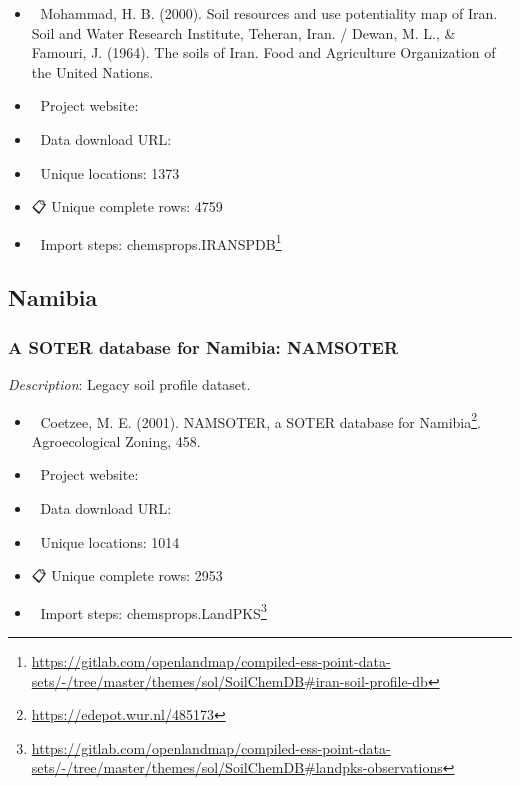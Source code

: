 \documentclass[
  graybox,natbib,nospthms]{svmono}
\providecommand{\tightlist}{%
  \setlength{\itemsep}{0pt}\setlength{\parskip}{0pt}}
\providecommand{\tightlist}{\setlength{\itemsep}{0pt}\setlength{\parskip}{0pt}}
\renewcommand{\href}[2]{#2 (\url{#1})}
\renewcommand{\href}[2]{#2\footnote{\url{#1}}}
\begin{document}
\begin{itemize}
\tightlist
\item
  📕 Mohammad, H. B. (2000). Soil resources and use potentiality map of Iran. Soil and Water Research Institute, Teheran, Iran. / Dewan, M. L., \& Famouri, J. (1964). The soils of Iran. Food and Agriculture Organization of the United Nations.\\
\item
  🔗 Project website:\\
\item
  📂 Data download URL:\\
\item
  📍 Unique locations: 1373\\
\item
  📋 Unique complete rows: 4759\\
\item
  📝 Import steps: \href{https://gitlab.com/openlandmap/compiled-ess-point-data-sets/-/tree/master/themes/sol/SoilChemDB\#iran-soil-profile-db}{chemsprops.IRANSPDB}
\end{itemize}

\hypertarget{namibia}{%
\subsection{Namibia}\label{namibia}}

\hypertarget{a-soter-database-for-namibia-namsoter}{%
\subsubsection{A SOTER database for Namibia: NAMSOTER}\label{a-soter-database-for-namibia-namsoter}}

\emph{Description}: Legacy soil profile dataset.

\begin{itemize}
\tightlist
\item
  📕 Coetzee, M. E. (2001). \href{https://edepot.wur.nl/485173}{NAMSOTER, a SOTER database for Namibia}. Agroecological Zoning, 458.\\
\item
  🔗 Project website:\\
\item
  📂 Data download URL:\\
\item
  📍 Unique locations: 1014\\
\item
  📋 Unique complete rows: 2953\\
\item
  📝 Import steps: \href{https://gitlab.com/openlandmap/compiled-ess-point-data-sets/-/tree/master/themes/sol/SoilChemDB\#landpks-observations}{chemsprops.LandPKS}
\end{itemize}
\end{document}

